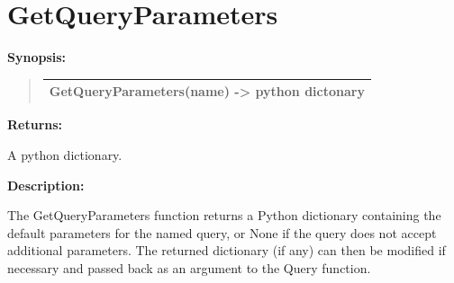 \documentclass[letterpaper,10pt,english]{sphinxmanual}
\begin{document}
\section{GetQueryParameters}
\label{functions:getqueryparameters}
\begin{DUlineblock}{0em}
\item[] \textbf{Synopsis:}
\end{DUlineblock}
\begin{quote}

\begin{tabulary}{\linewidth}{|L|}
\hline

GetQueryParameters(name) -\textgreater{} python dictonary
\\
\hline\end{tabulary}

\end{quote}

\begin{DUlineblock}{0em}
\item[] 
\item[] \textbf{Returns:}
\item[] A python dictionary.
\item[] 
\item[] \textbf{Description:}
\item[] The GetQueryParameters function returns a Python dictionary containing
the default parameters for the named query, or None if the query does
not accept additional parameters.  The returned dictionary (if any) can
then be modified if necessary and passed back as an argument to the
Query function.
\end{DUlineblock}

\begin{DUlineblock}{0em}
\item[] 
\end{DUlineblock}
\end{document}
